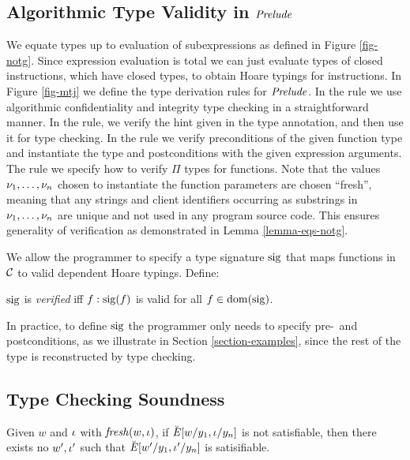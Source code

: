 \subsection{Algorithmic Type Validity in $\mathit{Prelude}$}

\mtjfig

We equate types up to evaluation of subexpressions as defined in
Figure \ref{fig-notg}. Since expression evaluation is total we can
just evaluate types of closed instructions, which have closed types,
to obtain Hoare typings for instructions. In Figure \ref{fig-mtj} we
define the type derivation rules for $\mathit{Prelude}$. In the
 rule we use algorithmic confidentiality and integrity
type checking in a straightforward manner.  In the 
rule, we verify the hint given in the type annotation, and then use it
for type checking.  In the  rule we verify preconditions
of the given function type and instantiate the type and postconditions
with the given expression arguments.  The  rule we
specify how to verify $\Pi$ types for functions. Note that the values
$\nu_1,\ldots,\nu_n$ chosen to instantiate the function parameters are
chosen ``fresh'', meaning that any strings and client identifiers
occurring as substrings in $\nu_1,\ldots,\nu_n$ are unique and
not used in any program source code. This ensures generality
of verification as demonstrated in Lemma \ref{lemma-eqs-notg}.

We allow the programmer to specify a type signature $\mathrm{sig}$ that
maps functions in $\mathcal{C}$ to valid dependent Hoare
typings. Define:
\begin{definition}
  $\mathrm{sig}$ is \emph{verified} iff $f : \mathrm{sig}(f)$ is valid for all $f \in \mathrm{dom}(\mathrm{sig})$.
\end{definition}
In practice, to define $\mathrm{sig}$ the programmer only needs to specify
pre-~and postconditions, as we illustrate in Section
\ref{section-examples}, since the rest of the type is reconstructed by
type checking.

\subsection{Type Checking Soundness}

\begin{lemma}
  \label{lemma-fresh}
  Given $w$ and $\iota$ with $\mathit{fresh}(w,\iota)$, if $\breve{\mathit{E}}[w/y_1,\iota/y_n]$
  is not satisfiable, then there exists no $w',\iota'$ such that
  $\breve{\mathit{E}}[w'/y_1,\iota'/y_n]$ is satisifiable.
\end{lemma}

